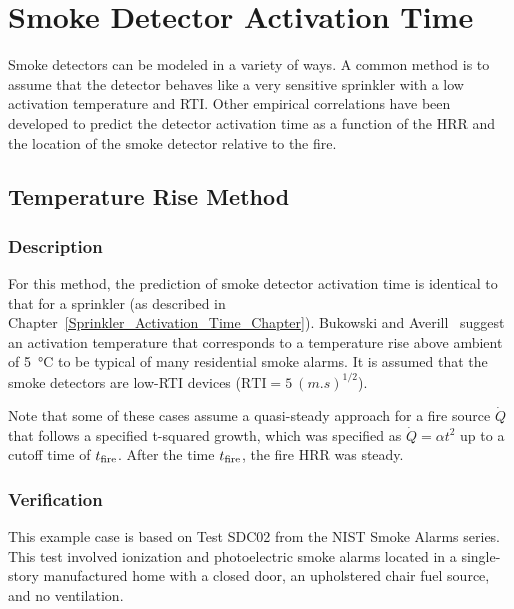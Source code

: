 
\chapter{Smoke Detector Activation Time}
\label{Smoke_Detector_Activation_Time_Chapter}

Smoke detectors can be modeled in a variety of ways. A common method is to assume that the detector behaves like a very sensitive sprinkler with a low activation temperature and RTI. Other empirical correlations have been developed to predict the detector activation time as a function of the HRR and the location of the smoke detector relative to the fire.

\section{Temperature Rise Method}
\label{sec:Temperature_Rise}

\subsection*{Description}

For this method, the prediction of smoke detector activation time is identical to that for a sprinkler (as described in Chapter~\ref{Sprinkler_Activation_Time_Chapter}). Bukowski and Averill~\cite{Bukowski:2} suggest an activation temperature that corresponds to a temperature rise above ambient of \SI{5}{\celsius} to be typical of many residential smoke alarms. It is assumed that the smoke detectors are low-RTI devices ($\textrm{RTI}=5~\si{(m.s)^{1/2}}$).

Note that some of these cases assume a quasi-steady approach for a fire source $\dot Q$ that follows a specified t-squared growth, which was specified as $\dot Q = \alpha t^2$ up to a cutoff time of $t\sb{fire}$. After the time $t\sb{fire}$, the fire HRR was steady.


\clearpage


\subsection*{Verification}

This example case is based on Test SDC02 from the NIST Smoke Alarms series. This test involved ionization and photoelectric smoke alarms located in a single-story manufactured home with a closed door, an upholstered chair fuel source, and no ventilation.

